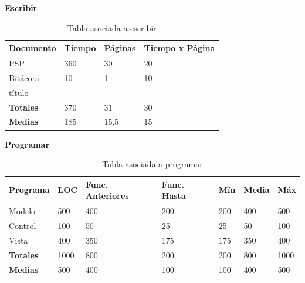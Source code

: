 \documentclass[a4paper,12pt,openany,oneside]{book}
\begin{document}
\begin{table}[!ht]
\textbf{Escribir}\\
\begin{tabular}{| l | l | l | l |}
\hline
\textbf{Documento} & \textbf{Tiempo} & \textbf{Páginas} & \textbf{Tiempo x Página}\\
\hline
PSP & 360 & 30 & 20 \\
\hline
Bitácora & 10 & 1 & 10 \\
\hline
título & & & \\
\hline
\textbf{Totales} & 370 & 31 & 30 \\
\hline
\textbf{Medias} & 185 & 15,5 & 15 \\
\hline
\end{tabular}
\caption{Tabla asociada a escribir}
\end{table}
\begin{table}[!ht]
\textbf{Programar}\\
\begin{tabular}{| l | l | l | l | l | l | l |}
\hline
\textbf{Programa} & \textbf{LOC} & \textbf{Func. Anteriores} & \textbf{Func. Hasta} & \textbf{Mín} & \textbf{Media} & \textbf{Máx}\\
\hline
Modelo & 			500  & 400 & 200 & 200 & 400 & 500 \\
\hline
Control &			100  & 50  & 25  & 25  & 50  & 100 \\
\hline
Vista &  			400  & 350 & 175 & 175 & 350 & 400\\
\hline
\textbf{Totales} &	1000 & 800 & 200 & 200 & 800 & 1000 \\
\hline
\textbf{Medias} & 	500	 & 400 & 100 & 100 & 400 & 500\\
\hline
\end{tabular}
\caption{Tabla asociada a programar}
\end{table}
\end{document}
